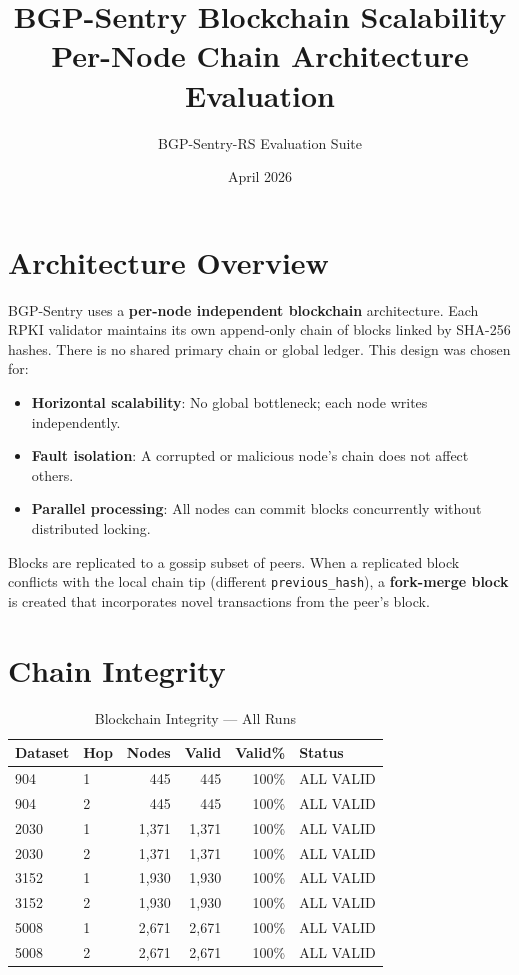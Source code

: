 \documentclass[11pt,a4paper]{article}
\title{\textbf{BGP-Sentry Blockchain Scalability\\[0.3em]\large Per-Node Chain Architecture Evaluation}}
\author{BGP-Sentry-RS Evaluation Suite}
\date{April 2026}
\begin{document}
\maketitle
\tableofcontents
\newpage

\section{Architecture Overview}

BGP-Sentry uses a \textbf{per-node independent blockchain} architecture. Each RPKI
validator maintains its own append-only chain of blocks linked by SHA-256 hashes.
There is no shared primary chain or global ledger. This design was chosen for:
\begin{itemize}
    \item \textbf{Horizontal scalability}: No global bottleneck; each node writes independently.
    \item \textbf{Fault isolation}: A corrupted or malicious node's chain does not affect others.
    \item \textbf{Parallel processing}: All nodes can commit blocks concurrently without
          distributed locking.
\end{itemize}

Blocks are replicated to a gossip subset of peers. When a replicated block conflicts
with the local chain tip (different \texttt{previous\_hash}), a \textbf{fork-merge block}
is created that incorporates novel transactions from the peer's block.

\section{Chain Integrity}

\begin{table}[H]
\centering
\caption{Blockchain Integrity --- All Runs}
\begin{tabular}{llrrrl}
\toprule
\textbf{Dataset} & \textbf{Hop} & \textbf{Nodes} & \textbf{Valid} & \textbf{Valid\%} & \textbf{Status} \\
\midrule
904   & 1 & 445   & 445   & 100\% & ALL VALID \\
904   & 2 & 445   & 445   & 100\% & ALL VALID \\
2030  & 1 & 1,371 & 1,371 & 100\% & ALL VALID \\
2030  & 2 & 1,371 & 1,371 & 100\% & ALL VALID \\
3152  & 1 & 1,930 & 1,930 & 100\% & ALL VALID \\
3152  & 2 & 1,930 & 1,930 & 100\% & ALL VALID \\
5008  & 1 & 2,671 & 2,671 & 100\% & ALL VALID \\
5008  & 2 & 2,671 & 2,671 & 100\% & ALL VALID \\
\bottomrule
\end{tabular}
\end{table}
\end{document}

